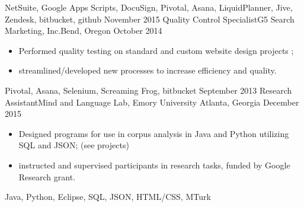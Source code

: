 \begin{experiences}
{\begin{itemize}
                      \end{itemize}
                    }
                    {NetSuite, Google Apps Scripts, DocuSign, Pivotal, Asana, LiquidPlanner, Jive, Zendesk, bitbucket, github}
  \emptySeparator
  \experiencetech
    {November 2015}     {Quality Control Specialist}{G5 Search Marketing, Inc.}{Bend, Oregon}
    {October 2014}    {
                      \begin{itemize}
                        \item Performed quality testing on standard and custom website design projects ;
                        \item streamlined/developed new processes to increase efficiency and quality.
                      \end{itemize}
                    }
                    {Pivotal, Asana, Selenium, Screaming Frog, bitbucket}
  \emptySeparator
    \experiencetech
    {September 2013} {Research Assistant}{Mind and Language Lab, Emory University }{Atlanta, Georgia}
    {December 2015}    {
                      \begin{itemize}
                        \item Designed programs for use in corpus analysis in Java and Python utilizing SQL and JSON; (see projects)
                        \item instructed and supervised participants in research tasks, funded by Google Research grant.                
                      \end{itemize}
                    }
                    {Java, Python, Eclipse, SQL, JSON, HTML/CSS, MTurk}
  \emptySeparator

\end{experiences}
